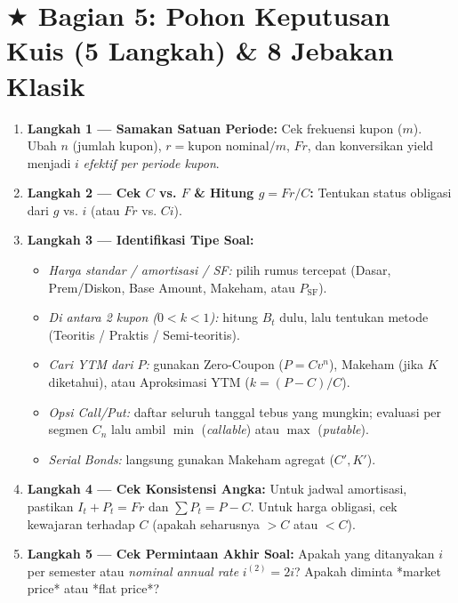 \documentclass[10pt,a4paper]{article}
\begin{document}
\section*{\large $\bigstar$ Bagian 5: Pohon Keputusan Kuis (5 Langkah) \& 8 Jebakan Klasik}

\begin{perhatianbox}
\begin{enumerate}[leftmargin=1.5em, topsep=1pt, itemsep=1.5pt]
    \item \textbf{Langkah 1 — Samakan Satuan Periode:} Cek frekuensi kupon ($m$). Ubah $n$ (jumlah kupon), $r = \text{kupon nominal}/m$, $Fr$, dan konversikan yield menjadi $i$ \textit{efektif per periode kupon}.
    \item \textbf{Langkah 2 — Cek $C$ vs. $F$ \& Hitung $g = Fr/C$:} Tentukan status obligasi dari $g$ vs. $i$ (atau $Fr$ vs. $Ci$).
    \item \textbf{Langkah 3 — Identifikasi Tipe Soal:}
    \begin{itemize}[leftmargin=1.2em, topsep=0.5pt, itemsep=1pt]
        \item \textit{Harga standar / amortisasi / SF:} pilih rumus tercepat (Dasar, Prem/Diskon, Base Amount, Makeham, atau $P_{\text{SF}}$).
        \item \textit{Di antara 2 kupon ($0 < k < 1$):} hitung $B_t$ dulu, lalu tentukan metode (Teoritis / Praktis / Semi-teoritis).
        \item \textit{Cari YTM dari $P$:} gunakan Zero-Coupon ($P=Cv^n$), Makeham (jika $K$ diketahui), atau Aproksimasi YTM ($k=(P-C)/C$).
        \item \textit{Opsi Call/Put:} daftar seluruh tanggal tebus yang mungkin; evaluasi per segmen $C_n$ lalu ambil $\min$ (\textit{callable}) atau $\max$ (\textit{putable}).
        \item \textit{Serial Bonds:} langsung gunakan Makeham agregat ($C', K'$).
    \end{itemize}
    \item \textbf{Langkah 4 — Cek Konsistensi Angka:} Untuk jadwal amortisasi, pastikan $I_t + P_t = Fr$ dan $\sum P_t = P - C$. Untuk harga obligasi, cek kewajaran terhadap $C$ (apakah seharusnya $> C$ atau $< C$).
    \item \textbf{Langkah 5 — Cek Permintaan Akhir Soal:} Apakah yang ditanyakan $i$ per semester atau \textit{nominal annual rate} $i^{(2)} = 2i$? Apakah diminta *market price* atau *flat price*?
\end{enumerate}
\end{perhatianbox}
\end{document}
